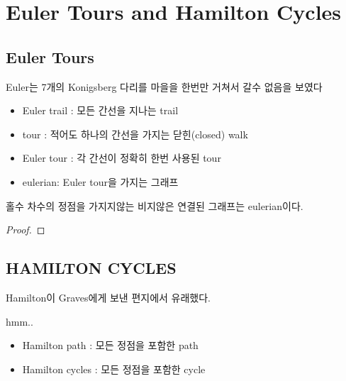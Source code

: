 \section{Euler Tours and Hamilton Cycles}

\subsection{Euler Tours}

\begin{dfn} Euler는 7개의 Konigsberg 다리를 마을을 한번만 거쳐서 갈수 없음을 보였다
    \begin{itemize}
        \item Euler trail : 모든 간선을 지나는 trail
        \item tour : 적어도 하나의 간선을 가지는 닫힌(closed) walk
        \item Euler tour : 각 간선이 정확히 한번 사용된 tour
        \item eulerian: Euler tour을 가지는 그래프
    \end{itemize}
\end{dfn}

\begin{theorem}
    홀수 차수의 정점을 가지지않는 비지않은 연결된 그래프는 eulerian이다.
\end{theorem}
\begin{proof}
    
\end{proof}


\subsection{HAMILTON CYCLES} Hamilton이 Graves에게 보낸 편지에서 유래했다.
\begin{dfn} hmm..
    \begin{itemize}
        \item Hamilton path : 모든 정점을 포함한 path
        \item Hamilton cycles : 모든 정점을 포함한 cycle
    \end{itemize}
\end{dfn}